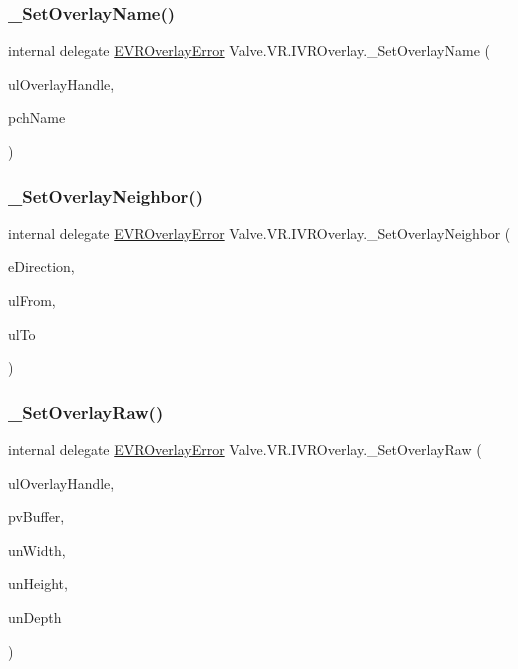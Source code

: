 \subsubsection{\texorpdfstring{\_SetOverlayName()}{\_SetOverlayName()}}
{\footnotesize\ttfamily internal delegate \mbox{\hyperlink{namespace_valve_1_1_v_r_aaee5c5144f42b7969d45b854f51b0c18}{E\+V\+R\+Overlay\+Error}} Valve.\+V\+R.\+I\+V\+R\+Overlay.\+\_\+\+Set\+Overlay\+Name (\begin{DoxyParamCaption}\item[{ulong}]{ul\+Overlay\+Handle,  }\item[{string}]{pch\+Name }\end{DoxyParamCaption})}

\mbox{\label{struct_valve_1_1_v_r_1_1_i_v_r_overlay_ac035a5a1c1aacd145f1268c402e3fe3d}} 
\subsubsection{\texorpdfstring{\_SetOverlayNeighbor()}{\_SetOverlayNeighbor()}}
{\footnotesize\ttfamily internal delegate \mbox{\hyperlink{namespace_valve_1_1_v_r_aaee5c5144f42b7969d45b854f51b0c18}{E\+V\+R\+Overlay\+Error}} Valve.\+V\+R.\+I\+V\+R\+Overlay.\+\_\+\+Set\+Overlay\+Neighbor (\begin{DoxyParamCaption}\item[{\mbox{\hyperlink{namespace_valve_1_1_v_r_ad0398c1325c370eb3a4796d89610b868}{E\+Overlay\+Direction}}}]{e\+Direction,  }\item[{ulong}]{ul\+From,  }\item[{ulong}]{ul\+To }\end{DoxyParamCaption})}

\mbox{\label{struct_valve_1_1_v_r_1_1_i_v_r_overlay_af2328af182be33f52a04f9a47242b811}} 
\subsubsection{\texorpdfstring{\_SetOverlayRaw()}{\_SetOverlayRaw()}}
{\footnotesize\ttfamily internal delegate \mbox{\hyperlink{namespace_valve_1_1_v_r_aaee5c5144f42b7969d45b854f51b0c18}{E\+V\+R\+Overlay\+Error}} Valve.\+V\+R.\+I\+V\+R\+Overlay.\+\_\+\+Set\+Overlay\+Raw (\begin{DoxyParamCaption}\item[{ulong}]{ul\+Overlay\+Handle,  }\item[{Int\+Ptr}]{pv\+Buffer,  }\item[{uint}]{un\+Width,  }\item[{uint}]{un\+Height,  }\item[{uint}]{un\+Depth }\end{DoxyParamCaption})}


